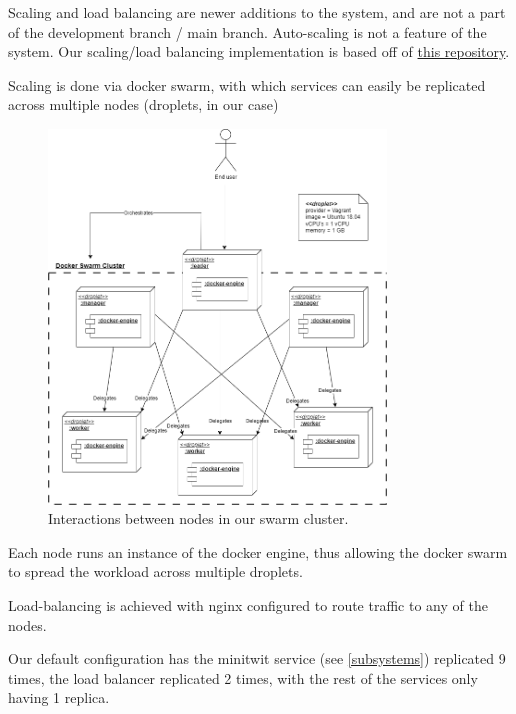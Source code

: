 
Scaling and load balancing are newer additions to the system, and are not a part of the development branch / main branch. Auto-scaling is not a feature of the system. Our scaling/load balancing implementation is based off of \href{https://github.com/itu-devops/itu-minitwit-docker-swarm-teraform}{this repository}.

Scaling is done via docker swarm, with which services can easily be replicated across multiple nodes (droplets, in our case) 

\begin{figure}[h]
\centering
\includegraphics[width=0.8\textwidth]{figures/deploySwarm.png}
\caption{Interactions between nodes in our swarm cluster.}
\label{fig:swarm}
\end{figure}

Each node runs an instance of the docker engine, thus allowing the docker swarm to spread the workload across multiple droplets.

Load-balancing is achieved with nginx configured to route traffic to any of the nodes.

Our default configuration has the minitwit service (see \ref{subsystems}) replicated 9 times, the load balancer replicated 2 times, with the rest of the services only having 1 replica.

